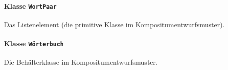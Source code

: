 \documentclass{lehramt-informatik-aufgabe}
\begin{document}
\begin{itemize}
%

\paragraph{Klasse \texttt{WortPaar}}

Das Listenelement (die primitive Klasse im Kompositumentwurfsmuster).

\begin{liAntwort}
\end{liAntwort}

%

\paragraph{Klasse \texttt{Wörterbuch}}

Die Behälterklasse im Kompositumentwurfsmuster.

\begin{liAntwort}
\end{liAntwort}

\end{itemize}
\end{document}
